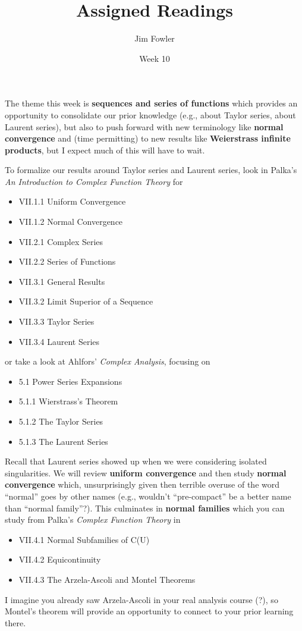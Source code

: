 \documentclass{homework}
\author{Jim Fowler}
\title{Assigned Readings}
\date{Week 10}
\begin{document}
\maketitle

The theme this week is \textbf{sequences and series of functions}
which provides an opportunity to consolidate our prior knowledge
(e.g., about Taylor series, about Laurent series), but also to push
forward with new terminology like \textbf{normal convergence} and
(time permitting) to new results like \textbf{Weierstrass infinite
  products}, but I expect much of this will have to wait.

To formalize our results around Taylor series and Laurent series, look
in Palka's \textit{An Introduction to Complex Function Theory} for
\begin{itemize}
\item VII.1.1 Uniform Convergence
\item VII.1.2 Normal Convergence
\item VII.2.1 Complex Series
\item VII.2.2 Series of Functions
\item VII.3.1 General Results
\item VII.3.2 Limit Superior of a Sequence
\item VII.3.3 Taylor Series
\item VII.3.4 Laurent Series
\end{itemize}
or take a look at Ahlfors' \textit{Complex Analysis}, focusing on
\begin{itemize}
\item 5.1 Power Series Expansions
\item 5.1.1 Wierstrass's Theorem
\item 5.1.2 The Taylor Series
\item 5.1.3 The Laurent Series
\end{itemize}
Recall that Laurent series showed up when we were considering isolated
singularities.  We will review \textbf{uniform convergence} and then
study \textbf{normal convergence} which, unsurprisingly given then
terrible overuse of the word ``normal'' goes by other names (e.g.,
wouldn't ``pre-compact'' be a better name than ``normal family''?).
This culminates in \textbf{normal families} which you can study from
Palka's \textit{Complex Function Theory} in
\begin{itemize}  
\item VII.4.1 Normal Subfamilies of C(U)
\item VII.4.2 Equicontinuity
\item VII.4.3 The Arzela-Ascoli and Montel Theorems
\end{itemize}
I imagine you already saw Arzela-Ascoli in your real analysis course
(?), so Montel's theorem will provide an opportunity to connect to
your prior learning there.
\end{document}
